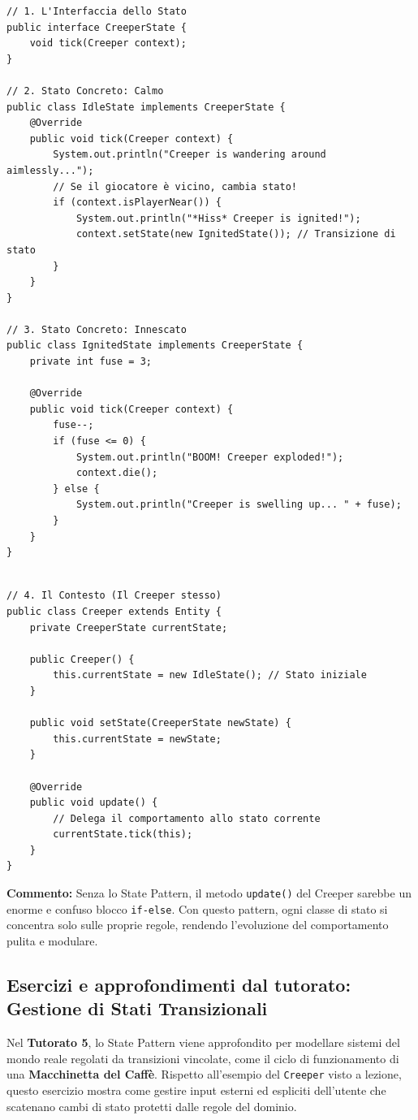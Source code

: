\documentclass[12pt, a4paper]{article}
\begin{document}
\begin{verbatim}
// 1. L'Interfaccia dello Stato
public interface CreeperState {
    void tick(Creeper context);
}

// 2. Stato Concreto: Calmo
public class IdleState implements CreeperState {
    @Override
    public void tick(Creeper context) {
        System.out.println("Creeper is wandering around aimlessly...");
        // Se il giocatore è vicino, cambia stato!
        if (context.isPlayerNear()) {
            System.out.println("*Hiss* Creeper is ignited!");
            context.setState(new IgnitedState()); // Transizione di stato
        }
    }
}

// 3. Stato Concreto: Innescato
public class IgnitedState implements CreeperState {
    private int fuse = 3;

    @Override
    public void tick(Creeper context) {
        fuse--;
        if (fuse <= 0) {
            System.out.println("BOOM! Creeper exploded!");
            context.die();
        } else {
            System.out.println("Creeper is swelling up... " + fuse);
        }
    }
}
\end{verbatim}

\newpage

\begin{verbatim}

// 4. Il Contesto (Il Creeper stesso)
public class Creeper extends Entity {
    private CreeperState currentState;

    public Creeper() {
        this.currentState = new IdleState(); // Stato iniziale
    }

    public void setState(CreeperState newState) {
        this.currentState = newState;
    }

    @Override
    public void update() {
        // Delega il comportamento allo stato corrente
        currentState.tick(this);
    }
}
\end{verbatim}
\textbf{Commento:} Senza lo State Pattern, il metodo \texttt{update()} del Creeper sarebbe un enorme e confuso blocco \texttt{if-else}. Con questo pattern, ogni classe di stato si concentra solo sulle proprie regole, rendendo l'evoluzione del comportamento pulita e modulare.

\subsection{Esercizi e approfondimenti dal tutorato: Gestione di Stati Transizionali}
Nel \textbf{Tutorato 5}, lo State Pattern viene approfondito per modellare sistemi del mondo reale regolati da transizioni vincolate, come il ciclo di funzionamento di una \textbf{Macchinetta del Caffè}. Rispetto all'esempio del \texttt{Creeper} visto a lezione, questo esercizio mostra come gestire input esterni ed espliciti dell'utente che scatenano cambi di stato protetti dalle regole del dominio.
\end{document}
